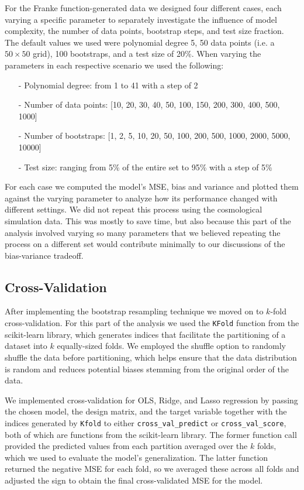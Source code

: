 \documentclass[aps,pra,english,notitlepage,reprint,nofootinbib]{revtex4-1}  %
\begin{document}
For the Franke function-generated data we designed four different cases, each varying a specific parameter to separately investigate the influence of model complexity, the number of data points, bootstrap steps, and test size fraction. The default values we used were polynomial degree 5, 50 data points (i.e. a $50\times50$ grid), 100 bootstraps, and a test size of 20\%. When varying the parameters in each respective scenario we used the following: 
\begin{itemize}
   \item [-] Polynomial degree: from 1 to 41 with a step of 2
   \item [-] Number of data points: [10, 20, 30, 40, 50, 100, 150, 200, 300, 400, 500, 1000]
   \item [-] Number of bootstraps: [1, 2, 5, 10, 20, 50, 100, 200, 500, 1000, 2000, 5000, 10000]
   \item [-] Test size: ranging from 5\% of the entire set to 95\% with a step of 5\%
\end{itemize}
For each case we computed the model's MSE, bias and variance and plotted them against the varying parameter to analyze how its performance changed with different settings. We did not repeat this process using the cosmological simulation data. This was mostly to save time, but also because this part of the analysis involved varying so many parameters that we believed repeating the process on a different set would contribute minimally to our discussions of the bias-variance tradeoff.

\subsection{Cross-Validation}
After implementing the bootstrap resampling technique we moved on to $k$-fold cross-validation. For this part of the analysis we used the \verb|KFold| function from the scikit-learn library, which generates indices that facilitate the partitioning of a dataset into $k$ equally-sized folds. We employed the shuffle option to randomly shuffle the data before partitioning, which helps ensure that the data distribution is random and reduces potential biases stemming from the original order of the data. 

We implemented cross-validation for OLS, Ridge, and Lasso regression by passing the chosen model, the design matrix, and the target variable together with the indices generated by \verb|Kfold| to either \verb|cross_val_predict| or \verb|cross_val_score|, both of which are functions from the scikit-learn library. The former function call provided the predicted values from each partition averaged over the $k$ folds, which we used to evaluate the model's generalization. The latter function returned the negative MSE for each fold, so we averaged these across all folds and adjusted the sign to obtain the final cross-validated MSE for the model.
\end{document}

